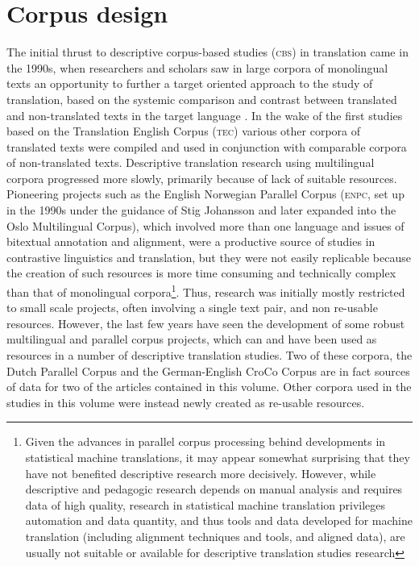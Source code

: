\documentclass[output=paper]{LSP/langsci}
\begin{document}
\section{Corpus design }
The initial thrust to descriptive corpus-based studies (\textsc{cbs}) in translation came in the 1990s, when researchers and scholars saw in large corpora of monolingual texts an opportunity to further a target oriented approach to the study of translation, based on the systemic comparison and contrast between translated and non-translated texts in the target language \citep{Baker1993}. In the wake of the first studies based on the Translation English Corpus (\textsc{tec}) \citep{Laviosa1997} various other corpora of translated texts were compiled and used in conjunction with comparable corpora of non-translated texts. Descriptive translation research using multilingual corpora progressed more slowly, primarily because of lack of suitable resources. Pioneering projects such as the English Norwegian Parallel Corpus (\textsc{enpc}, set up in the 1990s under the guidance of Stig Johansson \citep[see e.g.][]{Johansson2007} and later expanded into the Oslo Multilingual Corpus), which involved more than one language and issues of bitextual annotation and alignment, were a productive source of studies in contrastive linguistics and translation, but they were not easily replicable because the creation of such resources is more time consuming and technically complex than that of monolingual corpora\footnote{Given the advances in parallel corpus processing behind developments in statistical machine translations, it may appear somewhat surprising that they have not benefited descriptive research more decisively. However, while descriptive and pedagogic research depends on manual analysis and requires data of high quality, research in statistical machine translation privileges automation and data quantity, and thus tools and data developed for machine translation (including alignment techniques and tools, and aligned data), are usually not suitable or available for descriptive translation studies research}. Thus, research was initially mostly restricted to small scale projects, often involving a single text pair, and non re-usable resources. However, the last few years have seen the development of some robust multilingual and parallel corpus projects, which can and have been used as resources in a number of descriptive translation studies. Two of these corpora, the Dutch Parallel Corpus \citep{Rura2008} and the German-English CroCo Corpus \citep{Croco:2013} are in fact sources of data for two of the articles contained in this volume. Other corpora used in the studies in this volume were instead newly created as re-usable resources. 
\end{document}
